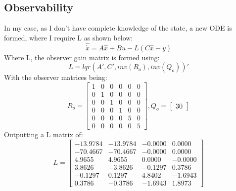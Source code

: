 \documentclass{article}
\begin{document}
\subsection{Observability}
In my case, as I don't have complete knowledge of the state, a new ODE is formed, where I require L as shown below:
\begin{equation}
    \hat{\dot{x}} = A\hat{x} + Bu - L(C\hat{x} - y)
\end{equation} \cite{Astrom2010}
Where L, the observer gain matrix is formed using:
\begin{equation}
    L = lqr(A',C',inv(R_{o}),inv(Q_{o}))'
\end{equation}
With the observer matrices being:
\begin{equation*}
    R_{o}= \begin{bmatrix}
     1 & 0 & 0 & 0 & 0& 0\\
    0 & 1 & 0 & 0 & 0 & 0\\
    0 & 0 & 1 & 0 & 0 & 0\\
    0 & 0 & 0 & 1 & 0& 0\\
    0 & 0 & 0 & 0 & 5& 0\\0&0&0&0&0&5
    \end{bmatrix} , Q_{o} = \begin{bmatrix}
    30
    \end{bmatrix}
\end{equation*}
Outputting a L matrix of:
\begin{equation}
    L = \begin{bmatrix}
    -13.9784 & -13.9784 & -0.0000   & 0.0000\\
    -70.4667 & -70.4667 &  -0.0000 &   0.0000\\
   4.9655  &  4.9655   & 0.0000 & -0.0000\\
  3.8626 &  -3.8626 &  -0.1297 &   0.3786\\
    -0.1297 & 0.1297   & 4.8402 &  -1.6943\\
    0.3786 &  -0.3786  & -1.6943 &   1.8973
    \end{bmatrix}
\end{equation}
\end{document}
